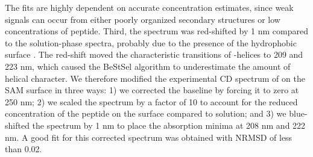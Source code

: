 The fits are highly dependent on accurate concentration estimates, since weak signals can occur from either poorly organized secondary structures or low concentrations of peptide. 
Third, the spectrum was red-shifted by 1 nm compared to the solution-phase spectra, probably due to the presence of the hydrophobic surface \cite{Chen1997}. 
The red-shift moved the characteristic transitions of \textalpha{}-helices to 209 and 223 nm, which caused the BeStSel algorithm to underestimate the amount of helical character. 
We therefore modified the experimental CD spectrum of \pep{} on the SAM surface in three ways: 
1) we corrected the baseline by forcing it to zero at 250 nm; 
2) we scaled the spectrum by a factor of 10 to account for the reduced concentration of the peptide on the surface compared to solution; and 
3) we blue-shifted the spectrum by 1 nm to place the absorption minima at 208 nm and 222 nm. 
A good fit for this corrected spectrum was obtained with NRMSD of less than 0.02. 

